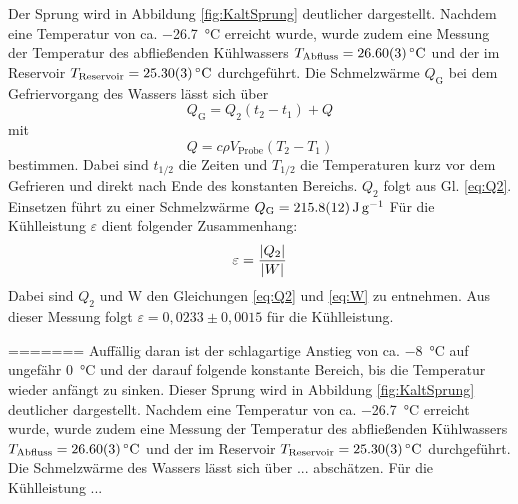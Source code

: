 	Der Sprung wird in Abbildung \ref{fig:KaltSprung} deutlicher dargestellt.
	Nachdem eine Temperatur  von ca. \SI{-26,7}{\celsius} erreicht wurde, wurde zudem eine Messung der Temperatur des abfließenden Kühlwassers $T_\text{Abfluss} = \SI{26,6+-0,03}{\celsius}$ und der im Reservoir $T_\text{Reservoir} = \SI{25,3+-0,03}{\celsius}$ durchgeführt.
	Die Schmelzwärme $Q_\text{G}$ bei dem Gefriervorgang des Wassers lässt sich über 
	\begin{equation} %
		Q_\text{G} = Q_2 (t_2 - t_1) + Q
	\end{equation} %
	mit
	\begin{equation} \label{eq:Q} %
		Q = c \rho V_\text{Probe} (T_2 - T_1)
	\end{equation} %
	bestimmen.
	Dabei sind $t_{1/2}$ die Zeiten und $T_{1/2}$ die Temperaturen kurz vor dem Gefrieren und direkt nach Ende des konstanten Bereichs.
	$Q_2$ folgt aus Gl. \ref{eq:Q2}.
	Einsetzen führt zu einer Schmelzwärme $Q_\text{G} = \SI{215.8+-1.2}{\joule\per\gram}$ 
	Für die Kühlleistung $\varepsilon$ dient folgender Zusammenhang:
	\begin{equation} \label{eq:eps} %
		\varepsilon = \frac{\abs{Q_2}}{\abs{W}}
	\end{equation} %
	Dabei sind $Q_2$ und W den Gleichungen \ref{eq:Q2} und \ref{eq:W} zu entnehmen.
	Aus dieser Messung folgt $\varepsilon = 0,0233\pm 0,0015$ für die Kühlleistung.
		
=======
	Auffällig daran ist der schlagartige Anstieg von ca. \SI{-8}{\celsius} auf ungefähr \SI{0}{\celsius} und der darauf folgende konstante Bereich, bis die Temperatur wieder anfängt zu sinken.
	Dieser Sprung wird in Abbildung \ref{fig:KaltSprung} deutlicher dargestellt.
	Nachdem eine Temperatur von ca. \SI{-26,7}{\celsius} erreicht wurde, wurde zudem eine Messung der Temperatur des abfließenden Kühlwassers $T_\text{Abfluss} = \SI{26,6+-0,03}{\celsius}$ und der im Reservoir $T_\text{Reservoir} = \SI{25,3+-0,03}{\celsius}$ durchgeführt.
	Die Schmelzwärme des Wassers lässt sich über ... abschätzen. %
	Für die Kühlleistung ...%
	
